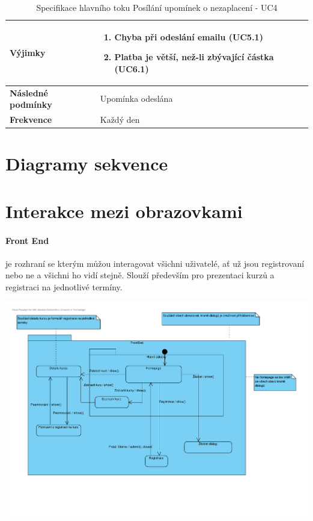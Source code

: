 \documentclass[12pt,a4paper,titlepage,final]{report}
\begin{document}
\begin{table}[h!]
\begin{center}
\begin{tabular}{ | p{4.2cm} | p{12.2cm} | }
    \textbf{Výjimky} & 
    \vspace{-3.5mm}
    \begin{enumerate}
		\itemsep0em 
		\item Chyba při odeslání emailu (UC5.1)
		\item Platba je větší, než-li zbývající částka (UC6.1)
	\end{enumerate}
    \\ \hline 
        
    \textbf{Následné podmínky} & Upomínka odeslána
    \\ \hline    
    
	\textbf{Frekvence} & Každý den
	\\ \hline		
    \end{tabular}
	\end{center}	
	\caption{Specifikace hlavního toku Posílání upomínek o nezaplacení - UC4}  
\end{table}


		
\section{Diagramy sekvence}

		
\section{Interakce mezi obrazovkami}

\paragraph{Front End} je rozhraní se kterým můžou interagovat všichni uživatelé, ať už jsou registrovaní nebo ne a všichni ho vidí stejně. Slouží především pro prezentaci kurzů a registraci na jednotlivé termíny.

\begin{center}
	\captionsetup{type=figure}
	\includegraphics[width=17cm]{img/frontend-obr.pdf}
\end{center}
\end{document}
